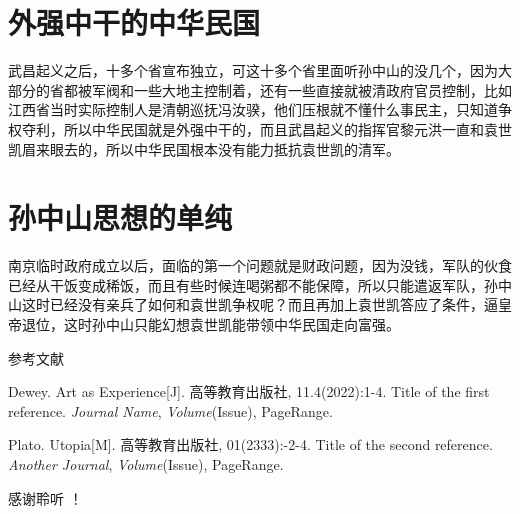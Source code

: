 \documentclass[10pt,a4paper]{beamer} %
\begin{document}
	\section{外强中干的中华民国}
	\begin{frame}
		武昌起义之后，十多个省宣布独立，可这十多个省里面听孙中山的没几个，因为大部分的省都被军阀和一些大地主控制着，还有一些直接就被清政府官员控制，比如江西省当时实际控制人是清朝巡抚冯汝骙，他们压根就不懂什么事民主，只知道争权夺利，所以中华民国就是外强中干的，而且武昌起义的指挥官黎元洪一直和袁世凯眉来眼去的，所以中华民国根本没有能力抵抗袁世凯的清军。
	\end{frame}
	
	\section{孙中山思想的单纯}
	\begin{frame}
		南京临时政府成立以后，面临的第一个问题就是财政问题，因为没钱，军队的伙食已经从干饭变成稀饭，而且有些时候连喝粥都不能保障，所以只能遣返军队，孙中山这时已经没有亲兵了如何和袁世凯争权呢？而且再加上袁世凯答应了条件，逼皇帝退位，这时孙中山只能幻想袁世凯能带领中华民国走向富强。
		
		
	\end{frame}
	
	\appendix
	\begin{frame}{参考文献}
		\begin{thebibliography}{99} %
			Dewey. Art as Experience[J]. 高等教育出版社, 11.4(2022):1-4.
			\newblock Title of the first reference.
			\newblock \emph{Journal Name}, \emph{Volume}(Issue), PageRange.
			
			Plato. Utopia[M]. 高等教育出版社, 01(2333):-2-4.
			\newblock Title of the second reference.
			\newblock \emph{Another Journal}, \emph{Volume}(Issue), PageRange.
		\end{thebibliography}
		
		
	\end{frame}
	
	\begin{frame}[plain,c]
		\begin{center}
			\Huge 感谢聆听 ！
		\end{center}
	\end{frame}
	
\end{document}
